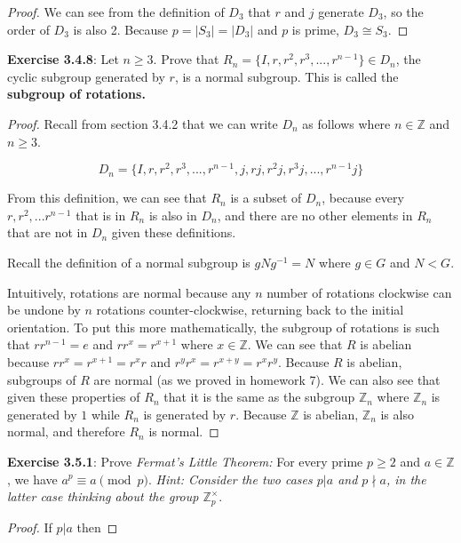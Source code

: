 \documentclass[a4paper]{article}
\begin{document}
\begin{myparindent}{0pt}
\begin{proof}
  We can see from the definition of $D_3$ that $r$ and $j$ generate $D_3$, so
  the order of $D_3$ is also 2. Because $p = |S_3| = |D_3|$ and $p$ is prime,
  $D_3 \cong S_3$.

\end{proof}

\textbf{Exercise 3.4.8}:
Let $n \ge 3$. Prove that $R_n = \{ I, r, r^2, r^3, ..., r^{n - 1} \} \in D_n$,
the cyclic subgroup generated by $r$, is a normal subgroup. This is called the
\textbf{subgroup of rotations.}
\begin{proof}
  Recall from section 3.4.2 that we can write $D_n$ as follows where
  $n \in \mathbb{Z}$ and $n \ge 3$.

  \[ D_n = \{I, r, r^2, r^3,..., r^{n-1},j,rj, r^2 j, r^3 j,..., r^{n-1} j \} \]

  From this definition, we can see that $R_n$ is a subset of $D_n$, because
  every $r, r^2, ... r^{n-1}$ that is in $R_n$ is also in $D_n$, and there are
  no other elements in $R_n$ that are not in $D_n$ given these definitions.
  \newline

  Recall the definition of a normal subgroup is $gNg^{-1} = N$ where $g \in G$
  and $N < G$. \newline

  Intuitively, rotations are normal because any $n$ number of rotations
  clockwise can be undone by $n$ rotations counter-clockwise, returning back
  to the initial orientation. To put this more mathematically, the subgroup of
  rotations is such that $rr^{n-1} = e$ and $rr^{x} = r^{x+1}$ where
  $x \in \mathbb{Z}$. We can see that $R$ is abelian because
  $rr^{x} = r^{x+1} = r^{x}r$ and $r^{y}r^{x} = r^{x+y} = r^{x}r^{y}$. Because
  $R$ is abelian, subgroups of $R$ are normal (as we proved in homework 7). We
  can also see that given these properties of $R_n$ that it is the same as the
  subgroup $\mathbb{Z}_n$ where $\mathbb{Z}_n$ is generated by $1$ while $R_n$
  is generated by $r$. Because $\mathbb{Z}$ is abelian, $\mathbb{Z}_n$ is also
  normal, and therefore $R_n$ is normal.
\end{proof}

\textbf{Exercise 3.5.1}:
Prove \textit{Fermat's Little Theorem:} For every prime $p \ge 2$ and
$a \in \mathbb{Z}$, we have $a^p \equiv a \pmod p$. \textit{Hint: Consider the
two cases $p|a$ and $p \nmid a$, in the latter case thinking about the group
$\mathbb{Z}_p^{\times}$}.
\begin{proof}
  If $p | a$ then


\end{proof}
\end{myparindent}
\end{document}

